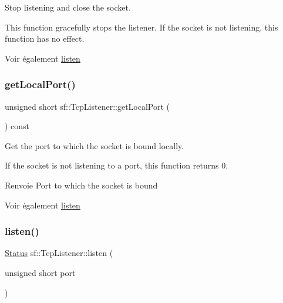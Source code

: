Stop listening and close the socket. 

This function gracefully stops the listener. If the socket is not listening, this function has no effect.

\begin{DoxySeeAlso}{Voir également}
\hyperlink{classsf_1_1TcpListener_a409d9350d3abfea9636df8cf4a61004e}{listen} 
\end{DoxySeeAlso}
\mbox{\label{classsf_1_1TcpListener_a784b9a9c59d4cdbae1795e90b8015780}} 
\subsubsection{\texorpdfstring{get\+Local\+Port()}{getLocalPort()}}
{\footnotesize\ttfamily unsigned short sf\+::\+Tcp\+Listener\+::get\+Local\+Port (\begin{DoxyParamCaption}{ }\end{DoxyParamCaption}) const}



Get the port to which the socket is bound locally. 

If the socket is not listening to a port, this function returns 0.

\begin{DoxyReturn}{Renvoie}
Port to which the socket is bound
\end{DoxyReturn}
\begin{DoxySeeAlso}{Voir également}
\hyperlink{classsf_1_1TcpListener_a409d9350d3abfea9636df8cf4a61004e}{listen} 
\end{DoxySeeAlso}
\mbox{\label{classsf_1_1TcpListener_a409d9350d3abfea9636df8cf4a61004e}} 
\subsubsection{\texorpdfstring{listen()}{listen()}}
{\footnotesize\ttfamily \hyperlink{classsf_1_1Socket_a51bf0fd51057b98a10fbb866246176dc}{Status} sf\+::\+Tcp\+Listener\+::listen (\begin{DoxyParamCaption}\item[{unsigned short}]{port }\end{DoxyParamCaption})}



